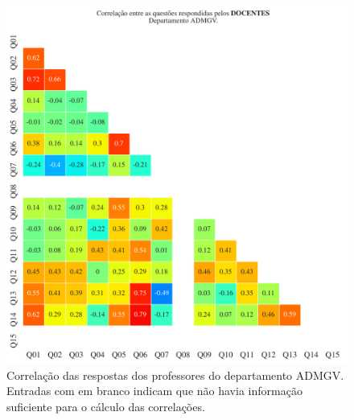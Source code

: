 \documentclass[a4paper,10pt]{article}
\begin{document}
\begin{figure}[h]
\centering
\includegraphics[width=0.999\linewidth]{matriz_corr__ADMGV_docentes.png}
\caption{\label{fig:corr_docentes}Correlação das respostas dos professores do departamento ADMGV. Entradas com em branco indicam que não havia informação suficiente para o cálculo das correlações.}
\end{figure}
\end{document}
